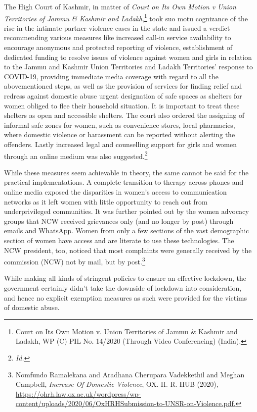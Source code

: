 \begin{multicols}{2}
\noi
The High Court of Kashmir, in matter of \textit{Court on Its Own Motion v Union Territories of
Jammu \& Kashmir and Ladakh},\footnote{Court on Its Own Motion v. Union Territories of Jammu \& Kashmir and Ladakh, WP (C) PIL No. 14/2020
(Through Video Conferencing) (India).} took suo motu cognizance of the rise in the intimate partner
violence cases in the state and issued a verdict recommending various measures like
increased call-in service availability to encourage anonymous and protected reporting of
violence, establishment of dedicated funding to resolve issues of violence against women and girls in relation to the Jammu and Kashmir Union Territories and Ladakh Territories'
response to COVID-19, providing immediate media coverage with regard to all the abovementioned steps, as well as the provision of services for finding relief and redress against
domestic abuse urgent designation of safe spaces as shelters for women obliged to flee their
household situation. It is important to treat these shelters as open and accessible shelters. The
court also ordered the assigning of informal safe zones for women, such as convenience
stores, local pharmacies, where domestic violence or harassment can be reported without
alerting the offenders. Lastly increased legal and counselling support for girls and women
through an online medium was also suggested.\footnote{\textit{Id.}}

\noi
While these measures seem achievable in theory, the same cannot be said for the practical
implementations. A complete transition to therapy across phones and online media exposed
the disparities in women's access to communication networks as it left women with little
opportunity to reach out from underprivileged communities. It was further pointed out by the
women advocacy groups that NCW received grievances only (and no longer by post) through
emails and WhatsApp. Women from only a few sections of the vast demographic section of
women have access and are literate to use these technologies. The NCW president, too,
noticed that most complaints were generally received by the commission (NCW) not by mail,
but by post.\footnote{Nomfundo Ramalekana and Aradhana Cherupara Vadekkethil and Meghan Campbell, \textit{Increase Of Domestic
Violence}, OX. H. R. HUB (2020), \url{https://ohrh.law.ox.ac.uk/wordpress/wp-content/uploads/2020/06/OxHRHSubmission-to-UNSR-on-Violence.pdf.}}

\noi
While making all kinds of stringent policies to ensure an effective lockdown, the government
certainly didn’t take the downside of lockdown into consideration, and hence no explicit
exemption measures as such were provided for the victims of domestic abuse. 


\end{multicols}
